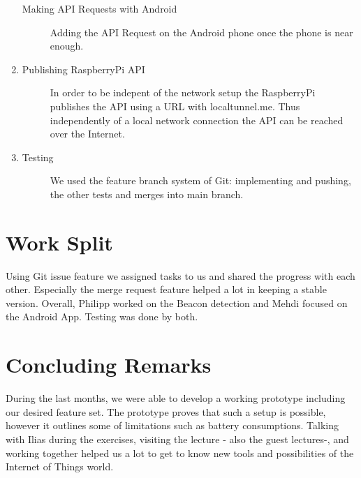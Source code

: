 \documentclass[
10pt, %
a4paper, %
oneside, %
headinclude,footinclude, %
BCOR5mm, %
]{scrartcl}
\begin{document}
\begin{enumerate}
\begin{description}
		\item[Making API Requests with Android] Adding the API Request on the Android phone once the phone is near enough.
	\end{description}
		\item 
		\begin{description}
		\item[Publishing RaspberryPi API] In order to be indepent of the network setup the RaspberryPi publishes the API using a URL with localtunnel.me. Thus independently of a local network connection the API can be reached over the Internet.
	\end{description}
	\item
	\begin{description}
		\item[Testing] We used the feature branch system of Git: implementing and pushing, the other tests and merges into main branch.
	\end{description}
\end{enumerate}

\section{Work Split}

Using Git issue feature we assigned tasks to us and shared the progress with each other. Especially the merge request feature helped a lot in keeping a stable version. Overall, Philipp worked on the Beacon detection and Mehdi focused on the Android App. Testing was done by both.


\section{Concluding Remarks}
During the last months, we were able to develop a working prototype including our desired feature set. The prototype proves that such a setup is possible, however it outlines some of limitations such as battery consumptions.
Talking with Ilias during the exercises, visiting the lecture - also the guest lectures-, and working together helped us a lot to get to know new tools and possibilities of the Internet of Things world.



\renewcommand{\refname}{\spacedlowsmallcaps{References}} %




\end{document}
